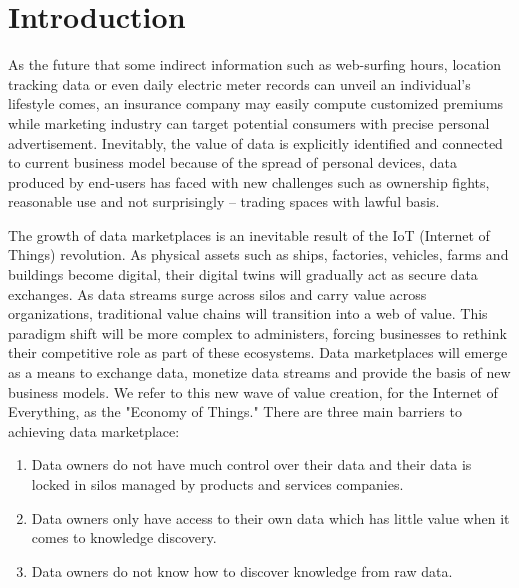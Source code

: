 \documentclass[journal,article,applsci,submit,moreauthors,pdftex]{Definitions/mdpi}
\begin{document}
\section{Introduction}
As the future that some indirect information such as web-surfing hours, location tracking data or even daily electric meter records can unveil an individual’s lifestyle comes, an insurance company may easily compute customized premiums while marketing industry can target potential consumers with precise personal advertisement. Inevitably, the value of data is explicitly identified and connected to current business model because of the spread of personal devices, data produced by end-users has faced with new challenges such as ownership fights, reasonable use and not surprisingly -- trading spaces with lawful basis.

The growth of data marketplaces is an inevitable result of the IoT (Internet of Things) revolution. As physical assets such as ships, factories, vehicles, farms and buildings become digital, their digital twins will gradually act as secure data exchanges.\cite{digitaltwin, AutonomousDriving} As data streams surge across silos and carry value across organizations, traditional value chains will transition into a web of value. This paradigm shift will be more complex to administers, forcing businesses to rethink their competitive role as part of these ecosystems. Data marketplaces will emerge as a means to exchange data, monetize data streams and provide the basis of new business models. We refer to this new wave of value creation, for the Internet of Everything, as the "Economy of Things." There are three main barriers to achieving data marketplace:
\begin{enumerate}[leftmargin=*,labelsep=4.9mm]
    \item Data owners do not have much control over their data and their data is locked in silos managed by products and services companies.
    \item Data owners only have access to their own data which has little value when it comes to knowledge discovery.
    \item Data owners do not know how to discover knowledge from raw data.
\end{enumerate}
\end{document}
